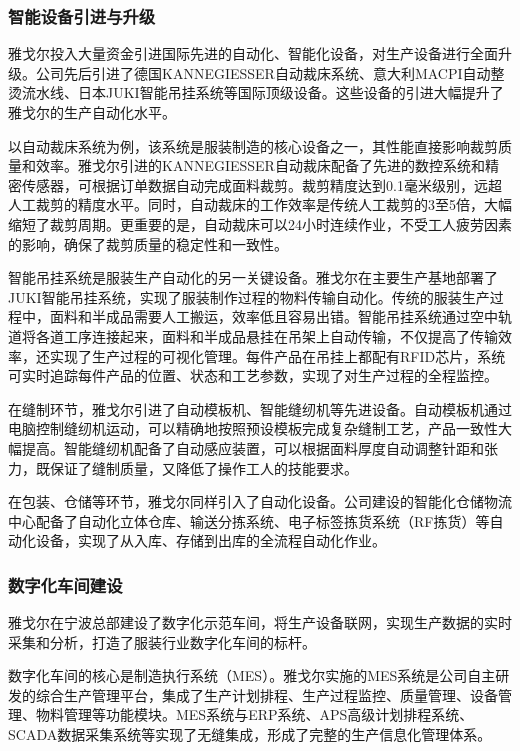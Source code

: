 \documentclass[12pt,a4paper]{article}
\begin{document}
\subsubsection{智能设备引进与升级}

雅戈尔投入大量资金引进国际先进的自动化、智能化设备，对生产设备进行全面升级。公司先后引进了德国KANNEGIESSER自动裁床系统、意大利MACPI自动整烫流水线、日本JUKI智能吊挂系统等国际顶级设备。这些设备的引进大幅提升了雅戈尔的生产自动化水平。

以自动裁床系统为例，该系统是服装制造的核心设备之一，其性能直接影响裁剪质量和效率。雅戈尔引进的KANNEGIESSER自动裁床配备了先进的数控系统和精密传感器，可根据订单数据自动完成面料裁剪。裁剪精度达到0.1毫米级别，远超人工裁剪的精度水平。同时，自动裁床的工作效率是传统人工裁剪的3至5倍，大幅缩短了裁剪周期。更重要的是，自动裁床可以24小时连续作业，不受工人疲劳因素的影响，确保了裁剪质量的稳定性和一致性。

智能吊挂系统是服装生产自动化的另一关键设备。雅戈尔在主要生产基地部署了JUKI智能吊挂系统，实现了服装制作过程的物料传输自动化。传统的服装生产过程中，面料和半成品需要人工搬运，效率低且容易出错。智能吊挂系统通过空中轨道将各道工序连接起来，面料和半成品悬挂在吊架上自动传输，不仅提高了传输效率，还实现了生产过程的可视化管理。每件产品在吊挂上都配有RFID芯片，系统可实时追踪每件产品的位置、状态和工艺参数，实现了对生产过程的全程监控。

在缝制环节，雅戈尔引进了自动模板机、智能缝纫机等先进设备。自动模板机通过电脑控制缝纫机运动，可以精确地按照预设模板完成复杂缝制工艺，产品一致性大幅提高。智能缝纫机配备了自动感应装置，可以根据面料厚度自动调整针距和张力，既保证了缝制质量，又降低了操作工人的技能要求。

在包装、仓储等环节，雅戈尔同样引入了自动化设备。公司建设的智能化仓储物流中心配备了自动化立体仓库、输送分拣系统、电子标签拣货系统（RF拣货）等自动化设备，实现了从入库、存储到出库的全流程自动化作业。

\subsubsection{数字化车间建设}

雅戈尔在宁波总部建设了数字化示范车间，将生产设备联网，实现生产数据的实时采集和分析，打造了服装行业数字化车间的标杆。

数字化车间的核心是制造执行系统（MES）。雅戈尔实施的MES系统是公司自主研发的综合生产管理平台，集成了生产计划排程、生产过程监控、质量管理、设备管理、物料管理等功能模块。MES系统与ERP系统、APS高级计划排程系统、SCADA数据采集系统等实现了无缝集成，形成了完整的生产信息化管理体系。
\end{document}
